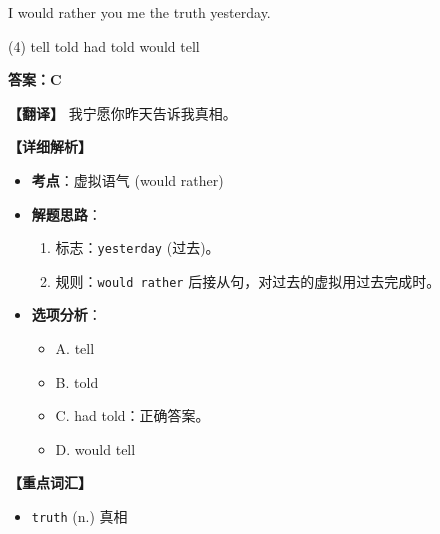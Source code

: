 \documentclass[11pt, a4paper]{article}
\newcommand{\analysis}[4]{
    \begin{solutionbox}
        \textbf{答案：#1}
        
        \textbf{【翻译】} #2
        
        \textbf{【详细解析】}
        #3
        
        \textbf{【重点词汇】}
        #4
    \end{solutionbox}
}
\newcommand{\blank}{\underline{\hspace{1.5cm}}}
\begin{document}
\begin{questions}
    \item I would rather you \blank me the truth yesterday.
    \begin{tasks}(4)
        \task tell \task told \task had told \task would tell
    \end{tasks}
    \analysis{C}{我宁愿你昨天告诉我真相。}{
        \begin{itemize}
            \item \textbf{考点}：虚拟语气 (would rather)
            \item \textbf{解题思路}：
                \begin{enumerate}
                    \item 标志：\texttt{yesterday} (过去)。
                    \item 规则：\texttt{would rather} 后接从句，对过去的虚拟用过去完成时。
                \end{enumerate}
            \item \textbf{选项分析}：
                \begin{itemize}
                    \item A. tell
                    \item B. told
                    \item C. had told：正确答案。
                    \item D. would tell
                \end{itemize}
        \end{itemize}
    }{
        \begin{itemize}
            \item \texttt{truth} (n.) 真相
        \end{itemize}
    }


\end{questions}
\end{document}
